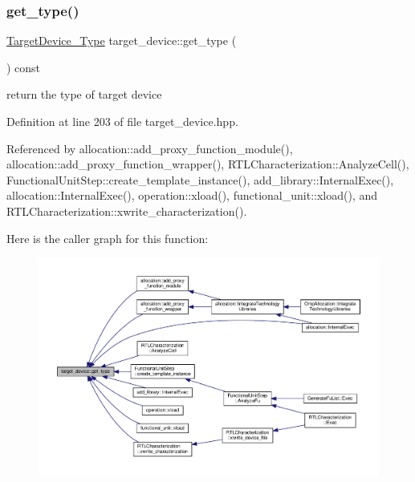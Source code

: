 \subsubsection{\texorpdfstring{get\+\_\+type()}{get\_type()}}
{\footnotesize\ttfamily \hyperlink{target__device_8hpp_a476becc690220f0805ce73006449c732}{Target\+Device\+\_\+\+Type} target\+\_\+device\+::get\+\_\+type (\begin{DoxyParamCaption}{ }\end{DoxyParamCaption}) const\hspace{0.3cm}{\ttfamily [inline]}}



return the type of target device 



Definition at line 203 of file target\+\_\+device.\+hpp.



Referenced by allocation\+::add\+\_\+proxy\+\_\+function\+\_\+module(), allocation\+::add\+\_\+proxy\+\_\+function\+\_\+wrapper(), R\+T\+L\+Characterization\+::\+Analyze\+Cell(), Functional\+Unit\+Step\+::create\+\_\+template\+\_\+instance(), add\+\_\+library\+::\+Internal\+Exec(), allocation\+::\+Internal\+Exec(), operation\+::xload(), functional\+\_\+unit\+::xload(), and R\+T\+L\+Characterization\+::xwrite\+\_\+characterization().

Here is the caller graph for this function\+:
\nopagebreak
\begin{figure}[H]
\begin{center}
\leavevmode
\includegraphics[width=350pt]{d9/dd8/classtarget__device_ad99d9910849ae26b259a7c8d67f8aa5e_icgraph}
\end{center}
\end{figure}
\mbox{\label{classtarget__device_a1ecf11f7b98c92c243f93a10d919f375}} 
